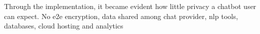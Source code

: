 Through the implementation, it became evident how little privacy a chatbot user can expect. No e2e encryption, data shared among chat provider, nlp tools, databases, cloud hosting and analytics
